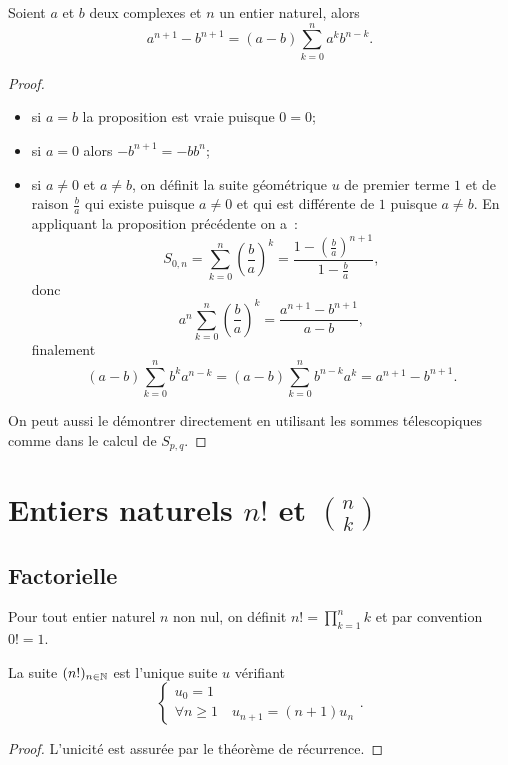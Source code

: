 \begin{prop}
  Soient $a$ et $b$ deux complexes et $n$ un entier naturel, alors
  \begin{equation}
    a^{n+1}-b^{n+1}=(a-b)\sum_{k=0}^n a^k b^{n-k}.
  \end{equation}
\end{prop}
\begin{proof}
  \begin{itemize}
  \item si $a=b$ la proposition est vraie puisque $0=0$;
  \item si $a=0$ alors $-b^{n+1}=-b b^n$;
  \item si $a\neq 0$ et $a\neq b$, on définit la suite géométrique $u$ de premier terme $1$ et de raison $\frac{b}{a}$ qui existe puisque $a\neq 0$ et qui est différente de $1$ puisque $a\neq b$. En appliquant la proposition précédente on a~: 
\begin{equation}
  S_{0,n}=\sum_{k=0}^n\left(\frac{b}{a}\right)^k=\frac{1-\left(\frac{b}{a}\right)^{n+1}}{1-\frac{b}{a}},
\end{equation}
donc
\begin{equation}
  a^n \sum_{k=0}^n\left(\frac{b}{a}\right)^k = \frac{a^{n+1}-b^{n+1}}{a-b},
\end{equation}
finalement
\begin{equation}
  (a-b)\sum_{k=0}^n b^ka^{n-k}=(a-b)\sum_{k=0}^n b^{n-k}a^{k}=a^{n+1}-b^{n+1}.
\end{equation}
\end{itemize}
On peut aussi le démontrer directement en utilisant les sommes télescopiques comme dans le calcul de $S_{p,q}$.
\end{proof}

\section{Entiers naturels $n!$ et $\binom{n}{k}$}

\subsection{Factorielle}

\begin{defdef}
  Pour tout entier naturel $n$ non nul, on définit $n!=\prod_{k=1}^n k$ et par convention $0!=1$.
\end{defdef}
\begin{prop}
  La suite $(n!)_{n\in\mathbb{N}}$ est l'unique suite $u$ vérifiant
  \begin{equation}
    \begin{cases}
      u_0=1 \\
      \forall n\geq 1 \quad u_{n+1}=(n+1) u_n
    \end{cases}.
  \end{equation}
\end{prop}
\begin{proof}
  L'unicité est assurée par le théorème de récurrence.
\end{proof}

